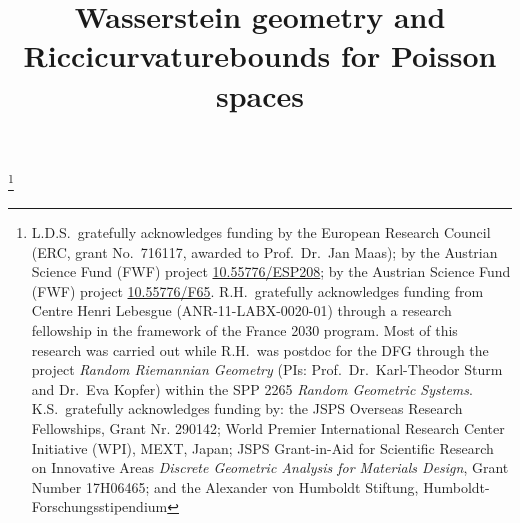 \documentclass[JEP,XML,SOM,Unicode,published]{cedram}
\theoremstyle{definition}
\theoremstyle{remark}
\begin{document}
\title[Wasserstein geometry and Ricci curvature bounds for Poisson spaces]{Wasserstein geometry and Ricci\nobreakspace curvature\nobreakspace bounds for Poisson spaces}

\author[\initial{L.} \lastname{Dello Schiavo}]{ }
\address{Institute of Science and Technology Austria,\\
Am Campus 1, 3400 Klosterneuburg, Austria}

\author[\initial{R.} \lastname{Herry}]{ }
\address{IRMAR, Université de Rennes,\\
263 avenue du Général Leclerc, 35042 Rennes Cedex, France}

\author[\initial{K.} \lastname{Suzuki}]{ }
\address{Department of Mathematical Science, Durham University,\\
Science Laboratories, South Road, DH1 3LE, United Kingdom}

\thanks{L.D.S.~gratefully acknowledges funding by the European Research Council (ERC, grant No.~716117, awarded to Prof.\ Dr.~Jan Maas);
by the Austrian Science Fund (FWF) project \href{https://doi.org/10.55776/ESP208}{{10.55776/ESP208}};
by the Austrian Science Fund (FWF) project \href{https://doi.org/10.55776/F65}{{10.55776/F65}}.
R.H.~gratefully acknowledges funding from Centre Henri Lebesgue (ANR-11-LABX-0020-01) through a research fellowship in the framework of the France 2030 program.
Most of this research was carried out while R.H.\ was postdoc for the DFG through the project \emph{Random Riemannian Geometry} (PIs: Prof.\ Dr.\ Karl-Theodor Sturm and Dr.\ Eva Kopfer) within the SPP 2265 \emph{Random Geometric Systems}.
K.S.~gratefully acknowledges funding by: the JSPS Overseas Research Fellowships, Grant Nr. 290142; World Premier International Research Center Initiative (WPI), MEXT, Japan; JSPS Grant-in-Aid for Scientific Research on Innovative Areas \emph{Discrete Geometric Analysis for Materials Design}, Grant Number 17H06465; and the Alexander von Humboldt Stiftung, Humboldt-Forschungsstipendium}
\end{document}
